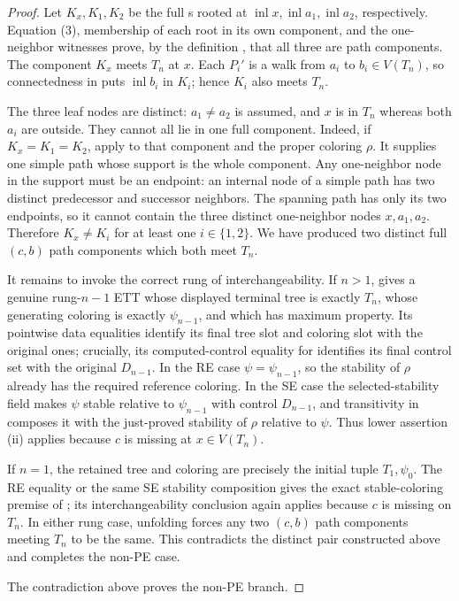 \begin{proof}
Let $K_x,K_1,K_2$ be the full s rooted at
$\operatorname{inl}x,\operatorname{inl}a_1,
\operatorname{inl}a_2$, respectively.  Equation (3), membership of each
root in its own component, and the one-neighbor witnesses prove, by the
definition , that all three are path
components.  The component $K_x$ meets $T_n$ at $x$.  Each $P_i'$ is a
walk from $a_i$ to $b_i\in V(T_n)$, so connectedness in
 puts $\operatorname{inl}b_i$ in $K_i$;
hence $K_i$ also meets $T_n$.

The three leaf nodes are distinct: $a_1\ne a_2$ is assumed, and $x$ is
in $T_n$ whereas both $a_i$ are outside.  They cannot all lie in one full
component.  Indeed, if $K_x=K_1=K_2$, apply
 to that component and the proper
coloring $\rho$.  It supplies one simple path whose support is the whole
component.  Any one-neighbor node in the support must be an endpoint:
an internal node of a simple path has two distinct predecessor and
successor neighbors.  The spanning path has only its two endpoints, so
it cannot contain the three distinct one-neighbor nodes $x,a_1,a_2$.
Therefore $K_x\ne K_i$ for at least one $i\in\{1,2\}$.  We have produced
two distinct full $(c,b)$ path components which both meet $T_n$.

It remains to invoke the correct rung of interchangeability.  If $n>1$,
 gives a genuine rung-$n-1$ ETT whose
displayed terminal tree is exactly $T_n$, whose generating coloring is
exactly $\psi_{n-1}$, and which has maximum property.  Its pointwise
data equalities identify its final tree slot and coloring slot with the
original ones; crucially, its computed-control equality for
 identifies its final control set with
the original $D_{n-1}$.  In the RE case $\psi=\psi_{n-1}$, so the
stability of $\rho$ already has the required reference coloring.  In the
SE case the selected-stability field makes $\psi$ stable relative to
$\psi_{n-1}$ with control $D_{n-1}$, and transitivity in
 composes it with the just-proved stability of $\rho$
relative to $\psi$.  Thus lower assertion (ii) applies because $c$ is
missing at $x\in V(T_n)$.

If $n=1$, the retained tree and coloring are precisely the initial tuple
$T_1,\psi_0$.  The RE equality or the same SE stability composition gives
the exact stable-coloring premise of ; its
interchangeability conclusion again applies because $c$ is missing on
$T_n$.  In either rung case, unfolding 
forces any two $(c,b)$ path components meeting $T_n$ to be the same.
This contradicts the distinct pair constructed above and completes the
non-PE case.

The contradiction above proves the non-PE branch.
\end{proof}
